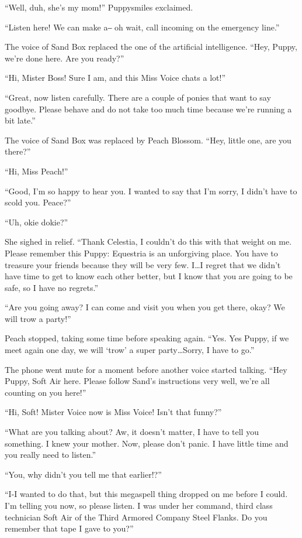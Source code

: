 ``Well, duh, she's my mom!'' Puppysmiles exclaimed.

``Listen here! We can make a‒ oh wait, call incoming on the emergency line.''

The voice of Sand Box replaced the one of the artificial intelligence. ``Hey, Puppy, we're done here. Are you ready?''

``Hi, Mister Boss! Sure I am, and this Miss Voice chats a lot!''

``Great, now listen carefully. There are a couple of ponies that want to say goodbye. Please behave and do not take too much time because we're running a bit late.''

The voice of Sand Box was replaced by Peach Blossom. ``Hey, little one, are you there?''

``Hi, Miss Peach!''

``Good, I'm so happy to hear you. I wanted to say that I'm sorry, I didn't have to scold you. Peace?''

``Uh, okie dokie?''

She sighed in relief. ``Thank Celestia, I couldn't do this with that weight on me. Please remember this Puppy: Equestria is an unforgiving place. You have to treasure your friends because they will be very few. I\dots I regret that we didn't have time to get to know each other better, but I know that you are going to be safe, so I have no regrets.''

``Are you going away? I can come and visit you when you get there, okay? We will trow a party!''

Peach stopped, taking some time before speaking again. ``Yes. Yes Puppy, if we meet again one day, we will `trow' a super party\dots Sorry, I have to go.''

The phone went mute for a moment before another voice started talking. ``Hey Puppy, Soft Air here. Please follow Sand's instructions very well, we're all counting on you here!''

``Hi, Soft! Mister Voice now is Miss Voice! Isn't that funny?''

``What are you talking about? Aw, it doesn't matter, I have to tell you something. I knew your mother. Now, please don't panic. I have little time and you really need to listen.''

``You, why didn't you tell me that earlier!?''

``I-I wanted to do that, but this megaspell thing dropped on me before I could. I'm telling you now, so please listen. I was under her command, third class technician Soft Air of the Third Armored Company Steel Flanks. Do you remember that tape I gave to you?''

